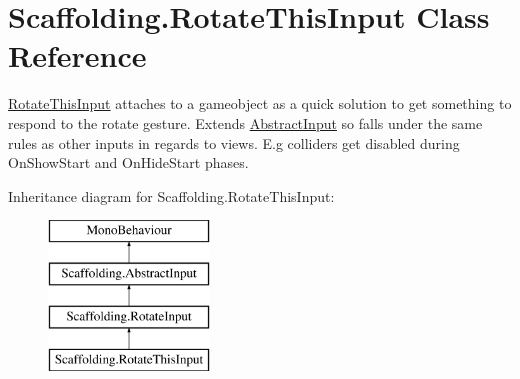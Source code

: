 \hypertarget{class_scaffolding_1_1_rotate_this_input}{\section{Scaffolding.\-Rotate\-This\-Input Class Reference}
\label{class_scaffolding_1_1_rotate_this_input}
}


\hyperlink{class_scaffolding_1_1_rotate_this_input}{Rotate\-This\-Input} attaches to a gameobject as a quick solution to get something to respond to the rotate gesture. Extends \hyperlink{class_scaffolding_1_1_abstract_input}{Abstract\-Input} so falls under the same rules as other inputs in regards to views. E.\-g colliders get disabled during On\-Show\-Start and On\-Hide\-Start phases.  


Inheritance diagram for Scaffolding.\-Rotate\-This\-Input\-:\begin{figure}[H]
\begin{center}
\leavevmode
\includegraphics[height=4.000000cm]{class_scaffolding_1_1_rotate_this_input}
\end{center}
\end{figure}
